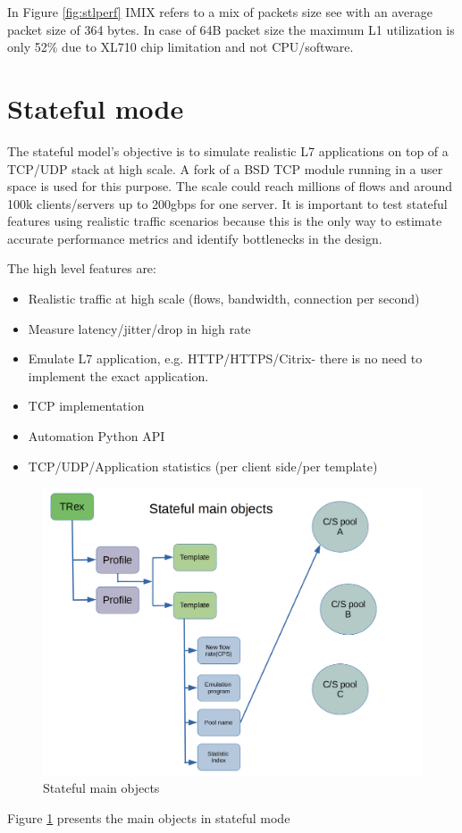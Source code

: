 \documentclass[letterpaper]{article}
\begin{document}
In Figure \ref{fig:stlperf} IMIX refers to a mix of packets size see \cite{b7} with an average packet size of 364 bytes.
In case of 64B packet size the maximum L1 utilization is only 52\% due to XL710 chip limitation and not CPU/software. 

\section{Stateful mode} 

The stateful model's objective is to simulate realistic L7 applications on top of a TCP/UDP stack at high scale. A fork of a BSD TCP module running in a user space is used for this purpose. 
The scale could reach millions of flows and around 100k clients/servers up to 200gbps for one server. 
It is important to test stateful features using realistic traffic scenarios because this is the only way to estimate accurate performance metrics and identify bottlenecks in the design. 

The high level features are:

\begin{itemize}
\item Realistic traffic at high scale (flows, bandwidth, connection per second)
\item Measure latency/jitter/drop in high rate
\item Emulate L7 application, e.g. HTTP/HTTPS/Citrix- there is no need to implement the exact application.
\item TCP implementation
\item Automation Python API 
\item TCP/UDP/Application statistics (per client side/per template)
\end{itemize}

\begin{figure}[h]
\includegraphics[width=0.45
\textwidth, center]{stateful_objects.png}
\caption{Stateful main objects}
\label{fig:astf_objects}
\end{figure}

Figure \ref{fig:astf_objects} presents the main objects in stateful mode 
\end{document}
